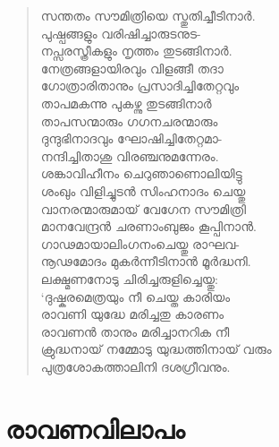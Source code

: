 \begin{verse}
സന്തതം സൗമിത്രിയെ സ്തുതിച്ചീടിനാര്‍.\\
പുഷ്പങ്ങളും വരിഷിച്ചാരുടനുട-\\
നപ്സരസ്ത്രീകളും നൃത്തം തുടങ്ങിനാര്‍.\\
നേത്രങ്ങളായിരവും വിളങ്ങീ തദാ\\
ഗോത്രാരിതാനും പ്രസാദിച്ചിതേറ്റവും\\
താപമകന്നു പുകഴ്ന്നു തുടങ്ങിനാര്‍\\
താപസന്മാരും ഗഗനചരന്മാരും\\
ദുന്ദുഭിനാദവും ഘോഷിച്ചിതേറ്റമാ-\\
നന്ദിച്ചിതാശു വിരഞ്ചനുമന്നേരം.\\
ശങ്കാവിഹീനം ചെറുഞാണൊലിയിട്ടു\\
ശംഖും വിളിച്ചുടന്‍ സിംഹനാദം ചെയ്തു\\
വാനരന്മാരുമായ് വേഗേന സൗമിത്രി\\
മാനവേന്ദ്രന്‍ ചരണാംബുജം കൂപ്പിനാന്‍.\\
ഗാഢമായാലിംഗനംചെയ്തു രാഘവ-\\
നൂഢമോദം മുകര്‍ന്നീടിനാന്‍ മൂര്‍ദ്ധനി.\\
ലക്ഷ്മണനോടു ചിരിച്ചരുളിച്ചെയ്തു:\\
‘ദുഷ്കരമെത്രയും നീ ചെയ്ത കാരിയം\\
രാവണി യുദ്ധേ മരിച്ചതു കാരണം\\
രാവണന്‍ താനും മരിച്ചാനറിക നീ\\
ക്രുദ്ധനായ് നമ്മോടു യുദ്ധത്തിനായ് വരും\\
പുത്രശോകത്താലിനി ദശഗ്രീവനും.
\end{verse}


\section{രാവണവിലാപം}

